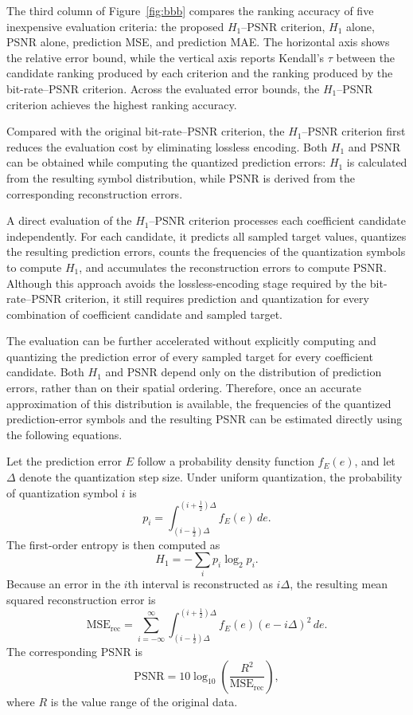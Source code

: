 The third column of Figure~\ref{fig:bbb} compares the ranking accuracy of five inexpensive evaluation criteria: the proposed $H_1$--PSNR criterion, $H_1$ alone, PSNR alone, prediction MSE, and prediction MAE. The horizontal axis shows the relative error bound, while the vertical axis reports Kendall's $\tau$ between the candidate ranking produced by each criterion and the ranking produced by the bit-rate--PSNR criterion. Across the evaluated error bounds, the $H_1$--PSNR criterion achieves the highest ranking accuracy.

Compared with the original bit-rate--PSNR criterion, the $H_1$--PSNR criterion first reduces the evaluation cost by eliminating lossless encoding. Both $H_1$ and PSNR can be obtained while computing the quantized prediction errors: $H_1$ is calculated from the resulting symbol distribution, while PSNR is derived from the corresponding reconstruction errors.

A direct evaluation of the $H_1$--PSNR criterion processes each coefficient candidate independently. For each candidate, it predicts all sampled target values, quantizes the resulting prediction errors, counts the frequencies of the quantization symbols to compute $H_1$, and accumulates the reconstruction errors to compute PSNR. Although this approach avoids the lossless-encoding stage required by the bit-rate--PSNR criterion, it still requires prediction and quantization for every combination of coefficient candidate and sampled target.

The evaluation can be further accelerated without explicitly computing and quantizing the prediction error of every sampled target for every coefficient candidate. Both $H_1$ and PSNR depend only on the distribution of prediction errors, rather than on their spatial ordering. Therefore, once an accurate approximation of this distribution is available, the frequencies of the quantized prediction-error symbols and the resulting PSNR can be estimated directly using the following equations.

Let the prediction error $E$ follow a probability density function $f_E(e)$, and let $\Delta$ denote the quantization step size. Under uniform quantization, the probability of quantization symbol $i$ is
\begin{equation}
p_i=\int_{\left(i-\frac{1}{2}\right)\Delta}^{\left(i+\frac{1}{2}\right)\Delta}f_E(e)\,de.
\end{equation}
The first-order entropy is then computed as
\begin{equation}
H_1=-\sum_i p_i\log_2p_i.
\end{equation}
Because an error in the $i$th interval is reconstructed as $i\Delta$, the resulting mean squared reconstruction error is
\begin{equation}
\mathrm{MSE}_{\mathrm{rec}}=\sum_{i=-\infty}^{\infty}\int_{\left(i-\frac{1}{2}\right)\Delta}^{\left(i+\frac{1}{2}\right)\Delta}f_E(e)\left(e-i\Delta\right)^2\,de.
\end{equation}
The corresponding PSNR is
\begin{equation}
\mathrm{PSNR}=10\log_{10}\left(\frac{R^2}{\mathrm{MSE}_{\mathrm{rec}}}\right),
\end{equation}
where $R$ is the value range of the original data.


